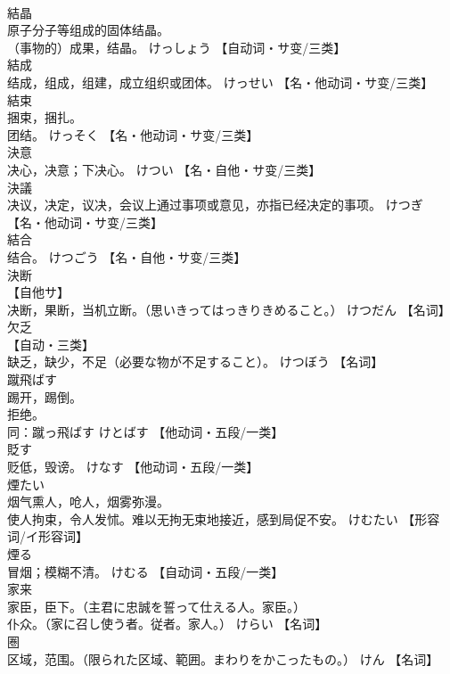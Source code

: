 \documentclass[8pt]{extreport}
\begin{document}
\begin{CJK}{UTF8}{min}
\\	結晶	
\\	原子分子等组成的固体结晶。 
\\	（事物的）成果，结晶。	けっしょう		【自动词・サ变/三类】
\\	結成	
\\	结成，组成，组建，成立组织或团体。	けっせい		【名・他动词・サ变/三类】
\\	結束	
\\	捆束，捆扎。 
\\	团结。	けっそく		【名・他动词・サ变/三类】
\\	決意	
\\	决心，决意；下决心。	けつい		【名・自他・サ变/三类】
\\	決議	
\\	决议，决定，议决，会议上通过事项或意见，亦指已经决定的事项。	けつぎ		【名・他动词・サ变/三类】
\\	結合	
\\	结合。	けつごう		【名・自他・サ变/三类】
\\	決断	
\\	【自他サ】 
\\	决断，果断，当机立断。（思いきってはっきりきめること。）	けつだん		【名词】
\\	欠乏	
\\	【自动・三类】 
\\	缺乏，缺少，不足（必要な物が不足すること）。	けつぼう		【名词】
\\	蹴飛ばす	
\\	踢开，踢倒。 
\\	拒绝。 
\\	同：蹴っ飛ばす	けとばす		【他动词・五段/一类】
\\	貶す	
\\	贬低，毁谤。	けなす		【他动词・五段/一类】
\\	煙たい	
\\	烟气熏人，呛人，烟雾弥漫。 
\\	使人拘束，令人发怵。难以无拘无束地接近，感到局促不安。	けむたい		【形容词/イ形容词】
\\	煙る	
\\	冒烟；模糊不清。	けむる		【自动词・五段/一类】
\\	家来	
\\	家臣，臣下。（主君に忠誠を誓って仕える人。家臣。） 
\\	仆众。（家に召し使う者。従者。家人。）	けらい		【名词】
\\	圏	
\\	区域，范围。（限られた区域、範囲。まわりをかこったもの。）	けん		【名词】

\end{CJK}
\end{document}
